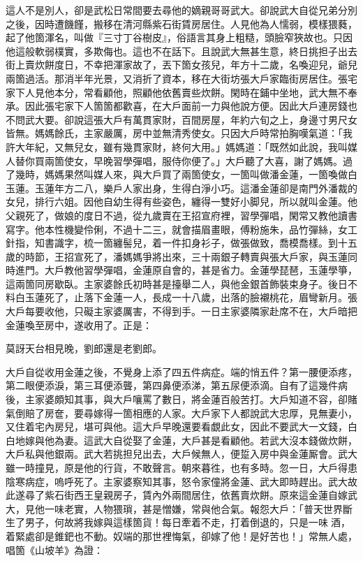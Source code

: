 這人不是別人，卻是武松日常間要去尋他的嫡親哥哥武大。卻說武大自從兄弟分別之後，因時遭饑饉，搬移在清河縣紫石街賃房居住。人見他為人懦弱，模樣猥蕤，起了他箇渾名，叫做『三寸丁谷樹皮』，俗語言其身上粗糙，頭臉窄狹故也。只因他這般軟弱樸實，多欺侮也。這也不在話下。且說武大無甚生意，終日挑担子出去街上賣炊餅度日，不幸把渾家故了，丟下箇女孩兒，年方十二歲，名喚迎兒，爺兒兩箇過活。那消半年光景，又消折了資本，移在大街坊張大戶家臨街房居住。張宅家下人見他本分，常看顧他，照顧他依舊賣些炊餅。閑時在鋪中坐地，武大無不奉承。因此張宅家下人箇箇都歡喜，在大戶面前一力與他說方便。因此大戶連房錢也不問武大要。卻說這張大戶有萬貫家財，百間房屋，年約六旬之上，身邊寸男尺女皆無。媽媽餘氏，主家嚴厲，房中並無清秀使女。只因大戶時常拍胸嘆氣道：「我許大年紀，又無兒女，雖有幾貫家財，終何大用。」媽媽道：「既然如此說，我叫媒人替你買兩箇使女，早晚習學彈唱，服侍你便了。」大戶聽了大喜，謝了媽媽。過了幾時，媽媽果然叫媒人來，與大戶買了兩箇使女，一箇叫做潘金蓮，一箇喚做白玉蓮。玉蓮年方二八，樂戶人家出身，生得白淨小巧。這潘金蓮卻是南門外潘裁的女兒，排行六姐。因他自幼生得有些姿色，纏得一雙好小脚兒，{}所以就叫金蓮。他父親死了，做娘的度日不過，從九歲賣在王招宣府裡，{}習學彈唱，閑常又教他讀書寫字。他本性機變伶俐，不過十二三，就會描眉畫眼，傅粉施朱，品竹彈絲，女工針指，知書識字，梳一箇纏髻兒，着一件扣身衫子，做張做致，喬模喬樣。{}到十五歲的時節，王招宣死了，潘媽媽爭將出來，三十兩銀子轉賣與張大戶家，與玉蓮同時進門。大戶教他習學彈唱，金蓮原自會的，甚是省力。金蓮學琵琶，玉蓮學箏，這兩箇同房歇臥。主家婆餘氏初時甚是擡舉二人，與他金銀首飾裝束身子。後日不料白玉蓮死了，止落下金蓮一人，長成一十八歲，出落的臉襯桃花，眉彎新月。張大戶每要收他，只礙主家婆厲害，不得到手。{}一日主家婆隣家赴席不在，大戶暗把金蓮喚至房中，遂收用了。正是：

\begin{myquote}
莫訝天台相見晚，劉郎還是老劉郎。{}
\end{myquote}

大戶自從收用金蓮之後，不覺身上添了四五件病症。{}端的悄五件？第一腰便添疼，第二眼便添淚，第三耳便添聾，第四鼻便添涕，第五尿便添滴。自有了這幾件病後，主家婆頗知其事，與大戶嚷罵了數日，將金蓮百般苦打。大戶知道不容，卻賭氣倒賠了房奩，要尋嫁得一箇相應的人家。大戶家下人都說武大忠厚，見無妻小，又住着宅內房兒，堪可與他。這大戶早晚還要看覷此女，{}因此不要武大一文錢，白白地嫁與他為妻。這武大自從娶了金蓮，大戶甚是看顧他。若武大沒本錢做炊餅，大戶私與他銀兩。武大若挑担兒出去，大戶候無人，便踅入房中與金蓮厮會。武大雖一時撞見，原是他的行貨，不敢聲言。朝來暮徃，也有多時。忽一日，大戶得患陰寒病症，嗚呼死了。主家婆察知其事，怒令家僮將金蓮、武大即時趕出。武大故此遂尋了紫石街西王皇親房子，賃內外兩間居住，依舊賣炊餅。原來這金蓮自嫁武大，見他一味老實，人物猥瑣，甚是憎嫌，{}常與他合氣。報怨大戶：「普天世界斷生了男子，何故將我嫁與這樣箇貨！每日牽着不走，打着倒退的，只是一味𠳹酒，着緊處卻是錐鈀也不動。奴端的那世裡悔氣，卻嫁了他！是好苦也！」常無人處，唱箇《山坡羊》為證：

